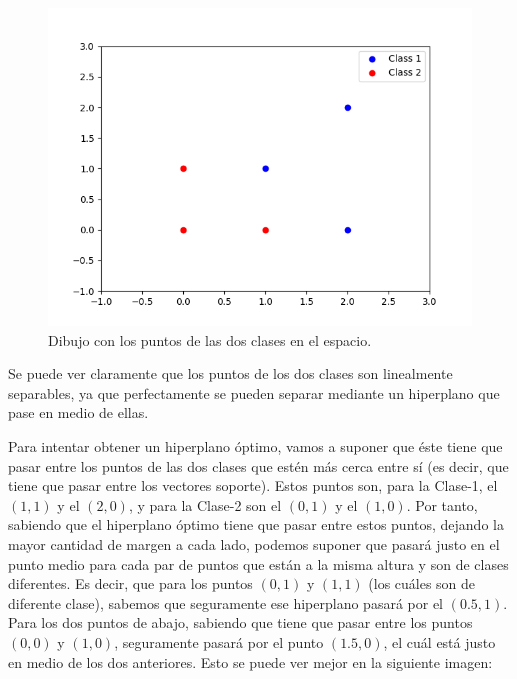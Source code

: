 \documentclass[11pt,a4paper]{article}
\begin{document}
\begin{figure}[H]
\centering
\includegraphics[scale=0.6]{img/points.png}
\caption{Dibujo con los puntos de las dos clases en el espacio.}
\end{figure}

Se puede ver claramente que los puntos de los dos clases son linealmente separables, ya que perfectamente se pueden separar mediante
un hiperplano que pase en medio de ellas.

Para intentar obtener un hiperplano óptimo, vamos a suponer que éste tiene que pasar entre los puntos de las dos clases que estén más
cerca entre sí (es decir, que tiene que pasar entre los vectores soporte). Estos puntos son, para la Clase-1, el $(1, 1)$ y el
$(2, 0)$, y para la Clase-2 son el $(0,1)$ y el $(1, 0)$. Por tanto, sabiendo que el hiperplano óptimo tiene que pasar entre estos
puntos, dejando la mayor cantidad de margen a cada lado, podemos suponer que pasará justo en el punto medio para cada par de puntos
que están a la misma altura y son de clases diferentes. Es decir, que para los puntos $(0, 1)$ y $(1, 1)$ (los cuáles son de
diferente clase), sabemos que seguramente ese hiperplano pasará por el $(0.5, 1)$. Para los dos puntos de abajo, sabiendo que tiene
que pasar entre los puntos $(0, 0)$ y $(1, 0)$, seguramente pasará por el punto $(1.5, 0)$, el cuál está justo en medio de los
dos anteriores. Esto se puede ver mejor en la siguiente imagen:
\end{document}
